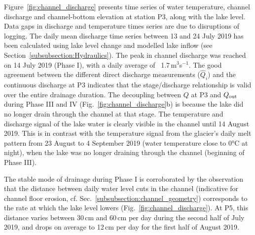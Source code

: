 \FloatBarrier


Figure~\ref{fig:channel_discharge} presents time series of water temperature, channel discharge and channel-bottom elevation at station P3, along with the lake level. Data gaps in discharge and temperature times series are due to disruptions of logging. The daily mean discharge time series between 13 and 24 July 2019 has been calculated using lake level change and modelled lake inflow (see Section~\ref{subsubsection:Hydraulics}). The peak in channel discharge was reached on 14 July 2019 (Phase I), with a daily average of ~1.7\,m$^3$s$^{-1}$. The good agreement between the different direct discharge measurements ($\hat Q_i$) and the continuous discharge at P3 indicates that the stage/discharge relationship is valid over the entire drainage duration. The decoupling between $Q$ at P3 and $Q_{\rm out}$ during Phase III and IV (Fig.~\ref{fig:channel_discharge}b) is because the lake did no longer drain through the channel at that stage. The temperature and discharge signal of the lake water is clearly visible in the channel until 14 August 2019. This is in contrast with the temperature signal from the glacier's daily melt pattern from 23 August to 4 September 2019 (water temperature close to 0°C at night), when the lake was no longer draining through the channel (beginning of Phase III).


The stable mode of drainage during Phase I is corroborated by the observation that the distance between daily water level cuts in the channel (indicative for channel floor erosion, cf. Sec.~\ref{subsubsection:channel_geometry}) corresponds to the rate at which the lake level lowers (Fig.~\ref{fig:channel_discharge}). At P5, this distance varies between 30\,cm and 60\,cm per day during the second half of July 2019, and  drops on average to 12\,cm per day for the first half of August 2019.


